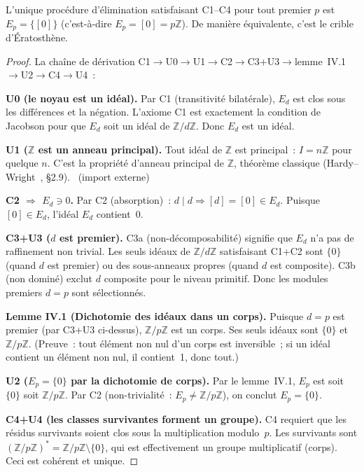 \documentclass[12pt,a4paper]{article}
\begin{document}
\mTHM
\begin{theoreme}
\label{thm:T6_universal}
L'unique procédure d'élimination satisfaisant C1--C4 pour tout
premier $p$ est $E_p = \{[0]\}$ (c'est-à-dire
$E_p = [0] = p\mathbb{Z}$). De manière équivalente, c'est le crible
d'Ératosthène.

\begin{proof}
La chaîne de dérivation
C1$\to$U0$\to$U1$\to$C2$\to$C3+U3$\to$lemme~IV.1$\to$U2$\to$C4$\to$U4~:

\medskip
\textbf{U0 (le noyau est un idéal).}
Par C1 (transitivité bilatérale), $E_d$ est clos sous les différences
et la négation. L'axiome C1 est exactement la condition de Jacobson
pour que $E_d$ soit un idéal de $\mathbb{Z}/d\mathbb{Z}$. Donc $E_d$
est un idéal. \THMTAG

\textbf{U1 ($\mathbb{Z}$ est un anneau principal).}
Tout idéal de $\mathbb{Z}$ est principal~: $I = n\mathbb{Z}$ pour
quelque $n$. C'est la propriété d'anneau principal de $\mathbb{Z}$,
théorème classique
(Hardy--Wright~\cite{HardyWright2008}, \S2.9).
\THMTAG~(import externe)

\textbf{C2 $\Rightarrow$ $E_d \ni 0$.}
Par C2 (absorption)~: $d \mid d \Rightarrow [d] = [0] \in E_d$.
Puisque $[0] \in E_d$, l'idéal $E_d$ contient~$0$.

\textbf{C3+U3 ($d$ est premier).}
C3a (non-décomposabilité) signifie que $E_d$ n'a pas de raffinement
non trivial. Les seuls idéaux de $\mathbb{Z}/d\mathbb{Z}$ satisfaisant
C1+C2 sont $\{0\}$ (quand $d$ est premier) ou des sous-anneaux propres
(quand $d$ est composite). C3b (non dominé) exclut $d$ composite pour
le niveau primitif. Donc les modules premiers $d = p$ sont
sélectionnés.

\textbf{Lemme IV.1 (Dichotomie des idéaux dans un corps).}
Puisque $d = p$ est premier (par C3+U3 ci-dessus),
$\mathbb{Z}/p\mathbb{Z}$ est un corps. Ses seuls idéaux sont $\{0\}$
et $\mathbb{Z}/p\mathbb{Z}$. (Preuve~: tout élément non nul d'un
corps est inversible~; si un idéal contient un élément non nul, il
contient~1, donc tout.)

\textbf{U2 ($E_p = \{0\}$ par la dichotomie de corps).}
Par le lemme~IV.1, $E_p$ est soit $\{0\}$ soit
$\mathbb{Z}/p\mathbb{Z}$. Par C2 (non-trivialité~:
$E_p \neq \mathbb{Z}/p\mathbb{Z}$), on conclut $E_p = \{0\}$.
\THMTAG

\textbf{C4+U4 (les classes survivantes forment un groupe).}
C4 requiert que les résidus survivants soient clos sous la
multiplication modulo~$p$. Les survivants sont
$(\mathbb{Z}/p\mathbb{Z})^* = \mathbb{Z}/p\mathbb{Z} \setminus \{0\}$,
qui est effectivement un groupe multiplicatif (corps). Ceci est
cohérent et unique.


\end{proof}
\end{theoreme}
\end{document}
